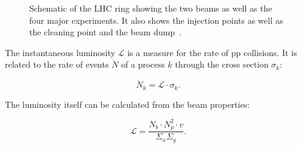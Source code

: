 \begin{figure}[htbp!]
  \begin{center}

\caption{Schematic of the LHC ring showing the two beams as well as the four major experiments. It also shows the injection points as well as the cleaning point and the beam dump~\cite{1748-0221-3-08-S08001}.
  \label{fig:det_LHC}}
  \end{center}
\end{figure}

The instantaneous luminosity $\mathcal{L}$ is a measure for the rate of pp collisions.
It is related to the rate of events $\dot N$ of a process $k$ through the cross section $\sigma_k$:

\begin{equation}
\dot N_k = \mathcal{L} \cdot \sigma_k.
\end{equation}

The luminosity itself can be calculated from the beam properties:

\begin{equation}
\mathcal{L} = \frac{N_b \cdot N_p^2 \cdot v}{\Sigma_x \Sigma_y}.
\end{equation}


